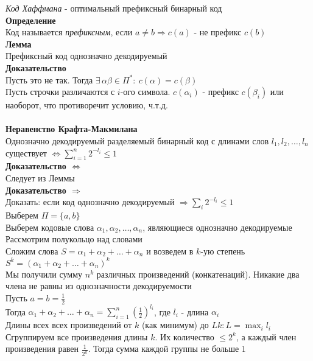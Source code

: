 \documentclass[12pt]{article}
\begin{document}
\textit{Код Хаффмана} - оптимальный префиксный бинарный код\\
\textbf{Определение}\\
Код называется \textit{префиксным}, если $a \neq b \Rightarrow c(a)$ - не префикс $c(b)$\\
\textbf{Лемма}\\
Префиксный код однозначно декодируемый\\
\textbf{Доказательство}\\
Пусть это не так.
Тогда $\exists\,\alpha\beta\in \Pi^*:\ c(\alpha)=c(\beta)$\\
Пусть строчки различаются с $i$-ого символа. $c(\alpha_i)$ - префикс $c(\beta_i)$ или наоборот, что противоречит условию, ч.т.д.\\\\
\textbf{Неравенство Крафта-Макмилана}\\
Однозначно декодируемый разделяемый бинарный код с длинами слов $l_1,l_2,\ldots,l_n$ существует $\Leftrightarrow \sum_{i=1}^n 2^{-l_i} \leq 1$\\
\textbf{Доказательство $\Leftrightarrow$}\\
Следует из Леммы\\
\textbf{Доказательство $\Rightarrow$}\\
Доказать: если код однозначно декодируемый $\Rightarrow \sum_{i}2^{-l_i} \leq 1$\\
Выберем $\Pi = \{a,b\}$\\
Выберем кодовые слова $\alpha_1, \alpha_2,\ldots,\alpha_n$, являющиеся однозначно декодируемые\\
Рассмотрим полукольцо над словами\\
Сложим слова $S=\alpha_1+\alpha_2+\ldots+\alpha_n$ и возведем в $k$-ую степень\\
$S^k=(\alpha_1+\alpha_2+\ldots+\alpha_n)^k$\\
Мы получили сумму $n^k$ различных произведений (конкатенаций). Никакие два члена не равны из однозначности декодируемости\\
Пусть $a=b=\frac12$\\
Тогда $\alpha_1+\alpha_2+\ldots+\alpha_n = \sum_{i=1}^n (\frac12)^{l_i}$, где $l_i$ - длина $\alpha_i$\\
Длины всех всех произведений от $k$ (как минимум) до $Lk: L = \max_i l_i$\\
Сгруппируем все произведения длины $k$. Их количество $\leq 2^k$, а каждый член произведения равен $\frac1{2^k}$. Тогда сумма каждой группы не больше $1$\\
\end{document}
